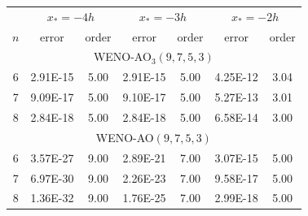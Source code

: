 \documentclass[11pt,landscape,usenames,dvipsnames,letterpaper,leqno]{article}
\def\Maroon{\textcolor{mymaroon}}
\newcommand\subhead[1]{\smallskip{\it\Maroon{#1}}}
\begin{document}
{{\subhead{WENO-JS weights}
\scriptsize 
\begin{tabular}{c|c c| c c| c c }
    \hline
        & \multicolumn{2}{c|}{$x_{\ast} = -4h$} & \multicolumn{2}{c|}{$x_{\ast} = -3h$} & \multicolumn{2}{c}{$x_{\ast} = -2h$}\\
     $n$   & error  &order       & error & order   & error &  order \\
    \hline
     \multicolumn{7}{c}{WENO-AO$_3(9,7,5,3)$}\\
    \hline
    6 &  2.91E-15 &  5.00 &  2.91E-15 &  5.00 &  4.25E-12 &  3.04 \\
    7 &  9.09E-17 &  5.00 &  9.10E-17 &  5.00 &  5.27E-13 &  3.01 \\
    8 &  2.84E-18 &  5.00 &  2.84E-18 &  5.00 &  6.58E-14 &  3.00 \\
    \hline
     \multicolumn{7}{c}{WENO-AO$(9,7,5,3)$}\\
    \hline
    6 &  3.57E-27 &  9.00 &  2.89E-21 &  7.00 &  3.07E-15 &  5.00  \\
    7 &  6.97E-30 &  9.00 &  2.26E-23 &  7.00 &  9.58E-17 &  5.00  \\
    8 &  1.36E-32 &  9.00 &  1.76E-25 &  7.00 &  2.99E-18 &  5.00  \\
    \hline
\end{tabular}

}}
\end{document}
